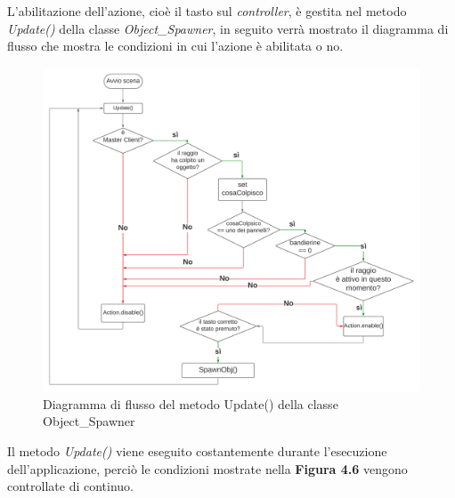 L'abilitazione dell'azione, cioè il tasto sul \textit{controller}, è gestita nel metodo \textit{Update()} della classe \textit{Object\_Spawner}, in seguito verrà mostrato il diagramma di flusso che mostra le condizioni in cui l'azione è abilitata o no.
\begin{figure}[H]
    \centering
    \includegraphics[scale = 0.45]{Immagini/Diagramma SpawnObj().jpg}
    \caption{Diagramma di flusso del metodo Update() della classe Object\_Spawner}
    \label{fig:my_label}
\end{figure}
\hspace{-0.6cm}Il metodo \textit{Update()} viene eseguito costantemente durante l'esecuzione dell'applicazione, perciò le condizioni mostrate nella \textbf{Figura 4.6} vengono controllate di continuo.
